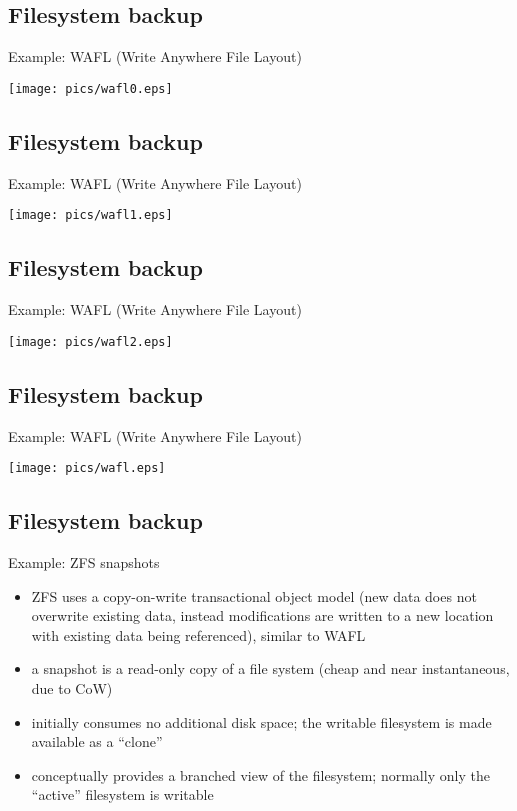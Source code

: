 \documentclass[xga]{xdvislides}
\begin{document}
\subsection{Filesystem backup}
Example: WAFL (Write Anywhere File Layout)
\vspace*{\fill}
\begin{center}
	\texttt{[image: pics/wafl0.eps]}
\end{center}
\vspace*{\fill}


\subsection{Filesystem backup}
Example: WAFL (Write Anywhere File Layout)
\vspace*{\fill}
\begin{center}
	\texttt{[image: pics/wafl1.eps]}
\end{center}
\vspace*{\fill}


\subsection{Filesystem backup}
Example: WAFL (Write Anywhere File Layout)
\vspace*{\fill}
\begin{center}
	\texttt{[image: pics/wafl2.eps]}
\end{center}
\vspace*{\fill}


\subsection{Filesystem backup}
Example: WAFL (Write Anywhere File Layout)
\vspace*{\fill}
\begin{center}
	\texttt{[image: pics/wafl.eps]}
\end{center}
\vspace*{\fill}


\subsection{Filesystem backup}
Example: ZFS snapshots
\begin{itemize}
	\item ZFS uses a copy-on-write transactional object model (new data does
		not overwrite existing data, instead modifications are written to a
		new location with existing data being referenced), similar to WAFL
	\item a snapshot is a read-only copy of a file system (cheap and near
		instantaneous, due to CoW)
	\item initially consumes no additional disk space; the writable filesystem
		is made available as a ``clone''
	\item conceptually provides a branched view of the filesystem; normally
		only the ``active'' filesystem is writable
\end{itemize}
\end{document}
